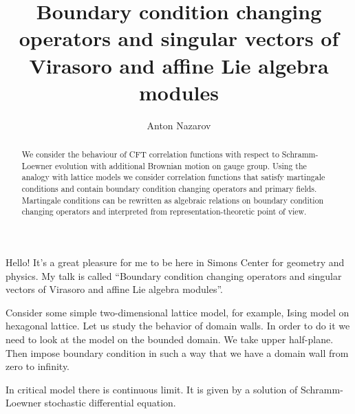\documentclass[a4paper]{article}
\title{Boundary condition changing operators and singular vectors of Virasoro and
affine Lie algebra modules}
\author{Anton Nazarov}
\begin{document}
\maketitle
\begin{abstract}
We consider the behaviour of CFT correlation functions with respect to
Schramm-Loewner evolution with additional Brownian motion on gauge
group. Using the analogy with lattice models we consider
correlation functions that satisfy martingale conditions and contain
boundary condition changing operators and primary fields.
Martingale conditions can be rewritten as algebraic relations on
boundary condition changing operators and interpreted from
representation-theoretic point of view.
\end{abstract}

Hello!
It's a great pleasure for me to be here in Simons Center for geometry and physics. 
My talk is called ``Boundary condition changing operators and singular vectors of Virasoro and
affine Lie algebra modules''. 

Consider some simple two-dimensional lattice model, for example, Ising
model on hexagonal lattice. Let us study the behavior of domain walls.
In order to do it we need to look at the model on the bounded domain.
We take upper half-plane. Then impose boundary condition in such a way
that we have a domain wall from zero to infinity.

In critical model there is continuous limit. It is given by a solution
of Schramm-Loewner stochastic differential equation. 
\end{document}
